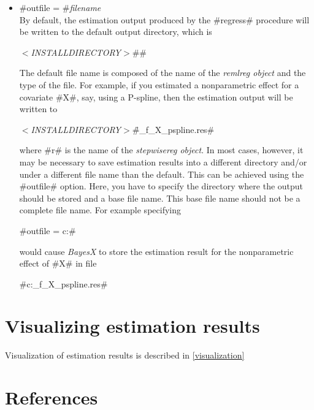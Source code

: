 \begin{itemize}
\item #outfile = #{\em filename} \\
By default, the estimation output produced by the #regress#
procedure will be written to the default output directory, which
is

{\em$<$INSTALLDIRECTORY$>$}#\output#

The default file name is composed of the name of the {\em remlreg
object} and the type of the file. For example, if you estimated a
nonparametric effect for a covariate #X#, say, using a P-spline,
then the estimation output will be written to

{\em$<$INSTALLDIRECTORY$>$}#\output\r_f_X_pspline.res#

where #r# is the name of the {\em stepwisereg object}. In most cases,
however, it may be necessary to save estimation results into a
different directory and/or under a different file name than the
default. This can be achieved using the #outfile# option. Here, you
have to specify the directory where the output should be stored and
a base file name. This base file name should not be a complete file
name. For example specifying

#outfile = c:\data{}#

would cause {\em BayesX} to store the estimation result for the
nonparametric effect of #X# in file

#c:\data{}_f_X_pspline.res#
\end{itemize}



\section{Visualizing estimation results}

Visualization of estimation results is described in
\autoref{visualization}

\section{References}
\label{stepwiseregreferences}

